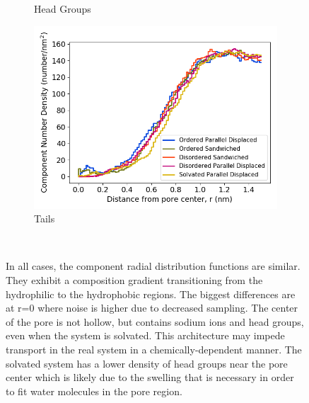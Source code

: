 \documentclass[journal=jpcbfk,manuscript=article]{achemso}
\begin{document}
\begin{figure}[!htb]
\begin{subfigure}{0.32\textwidth}
        \caption{Head Groups}
        \label{fig:head_groups_regional_density}
  \end{subfigure}
  \begin{subfigure}{0.32\textwidth}
        \includegraphics[width=1\linewidth]{tails_density.png}
        \caption{Tails}
        \label{fig:tails_regional_density}
  \end{subfigure}
  \caption{In all cases, the component radial distribution functions are similar. 
      They exhibit a composition gradient transitioning from the hydrophilic to the hydrophobic
	  regions. The biggest differences are at r=0 where noise is higher due to 
	  decreased sampling. The center of the pore is not hollow, but contains sodium ions and 
	  head groups, even when the system is solvated. This architecture may impede transport in 
	  the real system in a chemically-dependent manner. 
          The solvated system has a lower density of head groups near the 
	  pore center which is likely due to the swelling that is necessary in order to fit water
	  molecules in the pore region.}~\label{fig:overlaid_densities}
  \end{figure}
\end{document}
